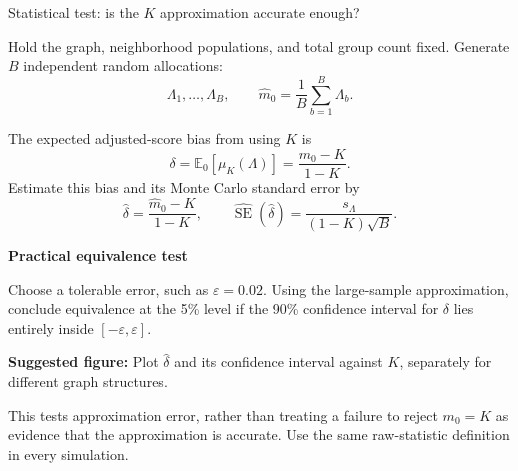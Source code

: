 \documentclass[aspectratio=169,10pt]{beamer}
\begin{document}
\begin{frame}[shrink=0]{Statistical test: is the $K$ approximation accurate enough?}
\small

Hold the graph, neighborhood populations, and total group count
fixed. Generate $B$ independent random allocations:
\[
    \Lambda_1,\ldots,\Lambda_B,
    \qquad
    \widehat m_0=\frac1B\sum_{b=1}^{B}\Lambda_b.
\]

The expected adjusted-score bias from using $K$ is
\[
    \boxed{
    \delta=\mathbb E_0[\mu_K(\Lambda)]
           =\frac{m_0-K}{1-K}}.
\]
Estimate this bias and its Monte Carlo standard error by
\[
    \widehat\delta=\frac{\widehat m_0-K}{1-K},
    \qquad
    \widehat{\operatorname{SE}}(\widehat\delta)
      =\frac{s_\Lambda}{(1-K)\sqrt B}.
\]

\textbf{Practical equivalence test}

Choose a tolerable error, such as $\varepsilon=0.02$.
Using the large-sample approximation, conclude equivalence at
the 5\% level if the 90\% confidence interval for $\delta$
lies entirely inside $[-\varepsilon,\varepsilon]$.

\medskip
\textbf{Suggested figure:}
Plot $\widehat\delta$ and its confidence interval against $K$,
separately for different graph structures.

\medskip
{\scriptsize
This tests approximation error, rather than treating a failure
to reject $m_0=K$ as evidence that the approximation is accurate.
Use the same raw-statistic definition in every simulation.
}

\end{frame}
\end{document}
